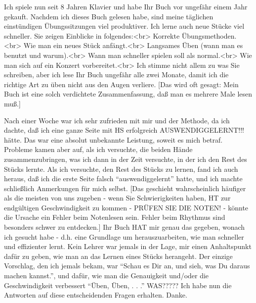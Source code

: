 \item \hypertarget{testimonials15}{}
Ich spiele nun seit 8 Jahren Klavier und habe Ihr Buch vor ungefähr einem Jahr gekauft.
Nachdem ich dieses Buch gelesen habe, sind meine täglichen einstündigen Übungssitzungen viel produktiver.
Ich lerne auch neue Stücke viel schneller.
Sie zeigen Einblicke in folgendes:<br>
Korrekte Übungsmethoden.<br>
Wie man ein neues Stück anfängt.<br>
Langsames Üben (wann man es benutzt und warum).<br>
Wann man schneller spielen soll als normal.<br>
Wie man sich auf ein Konzert vorbereitet.<br>
Ich stimme nicht allem zu was Sie schreiben, aber ich lese Ihr Buch ungefähr alle zwei Monate, damit ich die richtige Art zu üben nicht aus den Augen verliere.
[Das wird oft gesagt: Mein Buch ist eine solch verdichtete Zusammenfassung, daß man es mehrere Male lesen muß.]


\item \hypertarget{testimonials16}{}
Nach einer Woche war ich sehr zufrieden mit mir und der Methode, da ich dachte, daß ich eine ganze Seite mit HS erfolgreich AUSWENDIGGELERNT!!! hätte.
Das war eine absolut unbekannte Leistung, soweit es mich betraf.
Probleme kamen aber auf, als ich versuchte, die beiden Hände zusammenzubringen, was ich dann in der Zeit versuchte, in der ich den Rest des Stücks lernte.
Als ich versuchte, den Rest des Stücks zu lernen, fand ich auch heraus, daß ich die erste Seite falsch \enquote{auswendiggelernt} hatte, und ich machte schließlich Anmerkungen für mich selbst.
[Das geschieht wahrscheinlich häufiger als die meisten von uns zugeben - wenn Sie Schwierigkeiten haben, HT zur endgültigen Geschwindigkeit zu kommen - PRÜFEN SIE DIE NOTEN! - könnte die Ursache ein Fehler beim Notenlesen sein.
Fehler beim Rhythmus sind besonders schwer zu entdecken.]
Ihr Buch HAT mir genau das gegeben, wonach ich gesucht habe - d.h. eine Grundlage um herauszuarbeiten, wie man schneller und effizienter lernt.
Kein Lehrer war jemals in der Lage, mir einen Anhaltspunkt dafür zu geben, wie man an das Lernen eines Stücks herangeht.
Der einzige Vorschlag, den ich jemals bekam, war \enquote{Schau es Dir an, und sieh, was Du daraus machen kannst.}, und dafür, wie man die Genauigkeit und/oder die Geschwindigkeit verbessert \enquote{Üben, Üben, . . .} WAS?????
Ich habe nun die Antworten auf diese entscheidenden Fragen erhalten. Danke.


